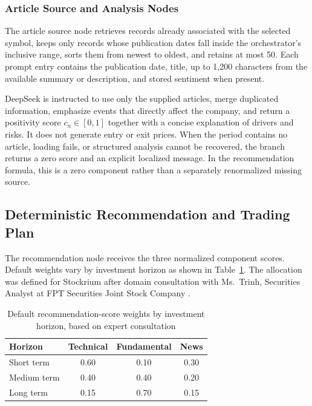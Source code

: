 \subsubsection{Article Source and Analysis Nodes}
\label{subsubsec:article-analysis-node}

The article source node retrieves records already associated with the selected symbol, keeps only records whose publication dates fall inside the orchestrator's inclusive range, sorts them from newest to oldest, and retains at most 50. Each prompt entry contains the publication date, title, up to 1,200 characters from the available summary or description, and stored sentiment when present.

DeepSeek is instructed to use only the supplied articles, merge duplicated information, emphasize events that directly affect the company, and return a positivity score $c_n\in[0,1]$ together with a concise explanation of drivers and risks. It does not generate entry or exit prices. When the period contains no article, loading fails, or structured analysis cannot be recovered, the branch returns a zero score and an explicit localized message. In the recommendation formula, this is a zero component rather than a separately renormalized missing source.

\subsection{Deterministic Recommendation and Trading Plan}
\label{subsec:analysis-recommendation-controls}

The recommendation node receives the three normalized component scores. Default weights vary by investment horizon as shown in Table~\ref{tab:confidence-horizon-weights}. The allocation was defined for Stockrium after domain consultation with Ms.~Trinh, Securities Analyst at FPT Securities Joint Stock Company \cite{trinh2026weights}.

\begin{table}[H]
    \centering
    \caption{Default recommendation-score weights by investment horizon, based on expert consultation \protect\cite{trinh2026weights}}
    \label{tab:confidence-horizon-weights}
    \small
    \renewcommand{\arraystretch}{1.2}
    \begin{tabular}{lccc}
        \toprule
        \textbf{Horizon} & \textbf{Technical} & \textbf{Fundamental} & \textbf{News} \\
        \midrule
        Short term & 0.60 & 0.10 & 0.30 \\
        Medium term & 0.40 & 0.40 & 0.20 \\
        Long term & 0.15 & 0.70 & 0.15 \\
        \bottomrule
    \end{tabular}
\end{table}

